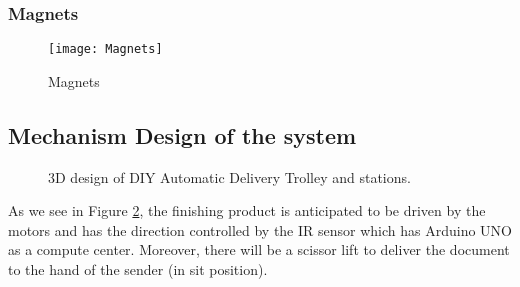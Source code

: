 \documentclass[12pt]{article}
\begin{document}
\subsubsection{Magnets} \label{subsub:magnets}

\begin{figure}[H]
	\centering
	\texttt{[image: Magnets]}
	\caption{Magnets} \label{fig:magnets}
\end{figure}

\subsection{Mechanism Design of the system} \label{sub:mechanism}

\begin{figure}[H]
	\centering
	 \hspace{1cm}
	\caption{3D design of DIY Automatic Delivery Trolley and stations.} \label{fig:3ddesign}
\end{figure}

As we see in Figure \ref{fig:3ddesign}, the finishing product is anticipated to be driven by the motors and has the direction controlled by the IR sensor which has Arduino UNO as a compute center. Moreover, there will be a scissor lift to deliver the document to the hand of the sender (in sit position).  
\end{document}
